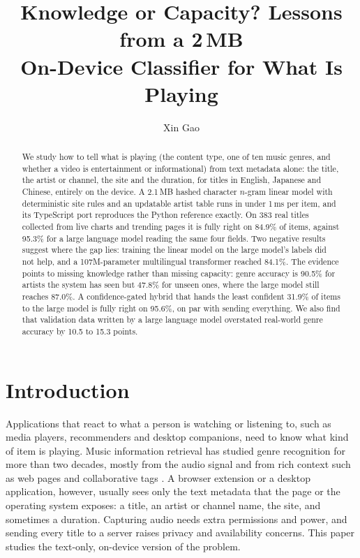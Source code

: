 \documentclass[11pt]{article}
\title{Knowledge or Capacity? Lessons from a 2\,MB\\ On-Device Classifier for What Is Playing}
\author{Xin Gao}
\date{}
\begin{document}
\maketitle

\begin{abstract}
We study how to tell what is playing (the content type, one of ten music genres, and whether a video is entertainment or informational) from text metadata alone: the title, the artist or channel, the site and the duration, for titles in English, Japanese and Chinese, entirely on the device. A 2.1\,MB hashed character $n$-gram linear model with deterministic site rules and an updatable artist table runs in under 1\,ms per item, and its TypeScript port reproduces the Python reference exactly. On 383 real titles collected from live charts and trending pages it is fully right on 84.9\% of items, against 95.3\% for a large language model reading the same four fields. Two negative results suggest where the gap lies: training the linear model on the large model's labels did not help, and a 107M-parameter multilingual transformer reached 84.1\%. The evidence points to missing knowledge rather than missing capacity: genre accuracy is 90.5\% for artists the system has seen but 47.8\% for unseen ones, where the large model still reaches 87.0\%. A confidence-gated hybrid that hands the least confident 31.9\% of items to the large model is fully right on 95.6\%, on par with sending everything. We also find that validation data written by a large language model overstated real-world genre accuracy by 10.5 to 15.3 points.
\end{abstract}

\section{Introduction}
\label{sec:intro}

Applications that react to what a person is watching or listening to, such as media players, recommenders and desktop companions, need to know what kind of item is playing. Music information retrieval has studied genre recognition for more than two decades, mostly from the audio signal and from rich context such as web pages and collaborative tags \citep{tzanetakis2002musical,schedl2014music}. A browser extension or a desktop application, however, usually sees only the text metadata that the page or the operating system exposes: a title, an artist or channel name, the site, and sometimes a duration. Capturing audio needs extra permissions and power, and sending every title to a server raises privacy and availability concerns. This paper studies the text-only, on-device version of the problem.
\end{document}
